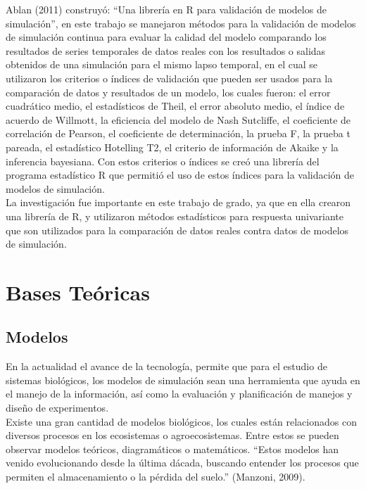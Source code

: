 Ablan (2011) construy\'o: “Una librer\'ia en R para validaci\'on de modelos de simulaci\'on”, en este trabajo se manejaron m\'etodos para la validaci\'on de modelos de simulaci\'on continua para evaluar la calidad del modelo comparando los resultados de series temporales de datos reales con los resultados o salidas obtenidos de una simulaci\'on para el mismo lapso temporal, en el cual se utilizaron los criterios o \'indices de validaci\'on que pueden ser usados para la comparaci\'on de datos y resultados de un modelo, los cuales fueron: el error cuadr\'atico medio, el estad\'isticos de Theil, el error absoluto medio, el \'indice de acuerdo de Willmott, la eficiencia del modelo de Nash Sutcliffe, el coeficiente de correlaci\'on de Pearson, el coeficiente de determinaci\'on, la prueba F, la prueba t pareada, el estad\'istico Hotelling T2, el criterio de informaci\'on de Akaike y la inferencia bayesiana. Con estos criterios o \'indices se cre\'o una librer\'ia del programa estad\'istico R que permiti\'o el uso de estos \'indices para la validaci\'on de modelos de simulaci\'on.\\

La investigaci\'on fue importante en este trabajo de grado, ya que en ella crearon una librer\'ia de R, y utilizaron m\'etodos estad\'isticos para respuesta univariante que son utilizados para la comparaci\'on de datos reales contra datos de modelos de simulaci\'on.\\

\section{Bases Te\'oricas}

\subsection{Modelos}

En la actualidad el avance de la tecnolog\'ia, permite que para el estudio de sistemas biol\'ogicos,  los modelos de simulaci\'on sean una herramienta que ayuda en el manejo de la informaci\'on, as\'i como la evaluaci\'on y planificaci\'on de manejos y dise\~no de experimentos.\\

Existe una gran cantidad de modelos biol\'ogicos, los cuales est\'an relacionados con diversos procesos en los ecosistemas o agroecosistemas. Entre estos se pueden observar modelos te\'oricos, diagram\'aticos o matem\'aticos. “Estos modelos han venido evolucionando desde la \'ultima d\'acada, buscando entender los procesos que permiten el almacenamiento o la p\'erdida del suelo.” (Manzoni, 2009).\\

